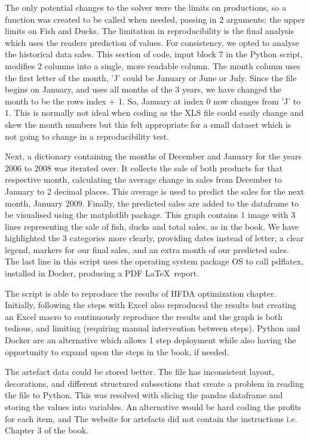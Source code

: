 \documentclass[acmtog]{acmart}
\begin{document}
The only potential changes to the solver were the limits on productions, so a function was created to be called when needed, passing in 2 arguments; the upper limits on Fish and Ducks. The limitation in reproducibility is the final analysis which uses the readers prediction of values. For consistency, we opted to analyse the historical data sales. This section of code, input block 7 in the Python script, modifies 2 columns into a single, more readable column. The month column uses the first letter of the month, 'J' could be January or June or July. Since the file begins on January, and uses all months of the 3 years, we have changed the month to be the rows index + 1. So, January at index 0 now changes from 'J' to 1. This is normally not ideal when coding as the XLS file could easily change and skew the month numbers but this felt appropriate for a small dataset which is not going to change in a reproducibility test. 

Next, a dictionary containing the months of December and January for the years 2006 to 2008 was iterated over. It collects the sale of both products for that respective month, calculating the average change in sales from December to January to 2 decimal places. This average is used to predict the sales for the next month, January 2009. Finally, the predicted sales are added to the dataframe to be visualised using the matplotlib package. This graph contains 1 image with 3 lines representing the sale of fish, ducks and total sales, as in the book. We have highlighted the 3 categories more clearly, providing dates instead of letter, a clear legend, markers for our final sales, and an extra month of our predicted sales. The last line in this script uses the operating system package OS to call pdflatex, installed in Docker, producing a PDF \LaTeX\ report.

The script is able to reproduce the results of HFDA optimization chapter. Initially, following the steps with Excel also reproduced the results but creating an Excel macro to continuously reproduce the results and the graph is both tedious, and limiting (requiring manual intervention between steps). Python and Docker are an alternative which allows 1 step deployment while also having the opportunity to expand upon the steps in the book, if needed.

The artefact data could be stored better. The file has inconsistent layout, decorations, and different structured subsections that create a problem in reading the file to Python. This was resolved with slicing the pandas dataframe and storing the values into variables. An alternative would be hard coding the profits for each item, and The website for artefacts did not contain the instructions i.e. Chapter 3 of the book.  
\end{document}
